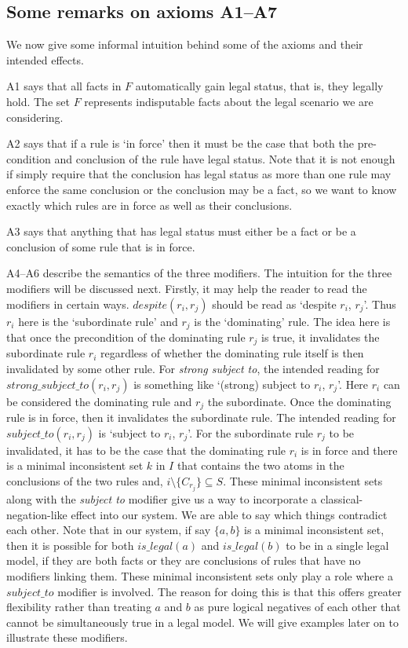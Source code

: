 \subsection{Some remarks on axioms A1--A7}
We now give some informal intuition behind some of the axioms and their intended effects.

A1 says that all facts in $F$ automatically gain legal status, that is, they legally hold. The set $F$ represents indisputable facts about the legal scenario we are considering.

A2 says that if a rule is `in force' then it must be the case that both the pre-condition and conclusion of the rule have legal status. Note that it is not enough if simply require that the conclusion has legal status as more than one rule may enforce the same conclusion or the conclusion may be a fact, so we want to know exactly which rules are in force as well as their conclusions.

A3 says that anything that has legal status must either be a fact or be a conclusion of some rule that is in force.

A4--A6 describe the semantics of the three modifiers. The intuition for the three modifiers will be discussed next. Firstly, it may help the reader to read the modifiers in certain ways. $despite(r_{i},r_{j})$ should be read as `despite $r_{i}$, $r_{j}$'. Thus $r_{i}$ here is the `subordinate rule' and $r_{j}$ is the `dominating' rule. The idea here is that once the precondition of the dominating rule $r_{j}$ is true, it invalidates the subordinate rule $r_{i}$ regardless of whether the dominating rule itself is then invalidated by some other rule. For \textit{strong subject to}, the intended reading for $strong\_subject\_to(r_{i},r_{j})$ is something like `(strong) subject to $r_{i}$, $r_{j}$'. Here $r_{i}$ can be considered the dominating rule and $r_{j}$ the subordinate. Once the dominating rule is in force, then it invalidates the subordinate rule. The intended reading for $subject\_to(r_{i},r_{j})$ is `subject to $r_{i}$, $r_{j}$'. For the subordinate rule $r_{j}$ to be invalidated, it has to be the case that the dominating rule $r_{i}$ is in force and there is a minimal inconsistent set $k$ in $I$ that contains the two atoms in the conclusions of the two rules and, $i\setminus\{C_{r_{j}}\}\subseteq S$. These minimal inconsistent sets along with the \textit{subject to} modifier give us a way to incorporate a classical-negation-like effect into our system. We are able to say which things contradict each other. Note that in our system, if say $\{a,b\}$ is a minimal inconsistent set, then it is possible for both $is\_legal(a)$ and $is\_legal(b)$ to be in a single legal model, if they are both facts or they are conclusions of rules that have no modifiers linking them. These minimal inconsistent sets only play a role where a $subject\_to$ modifier is involved. The reason for doing this is that this offers greater flexibility rather than treating $a$ and $b$ as pure logical negatives of each other that cannot be simultaneously true in a legal model. We will give examples later on to illustrate these modifiers.

